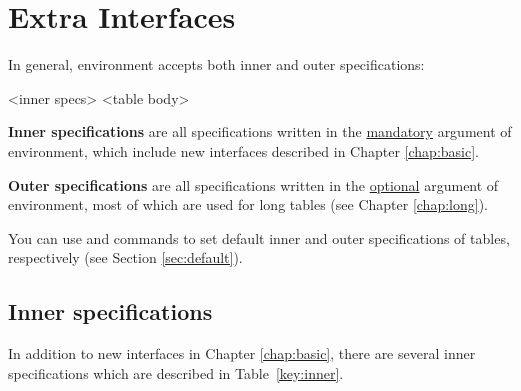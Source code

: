 \documentclass[oneside]{book}
\begin{document}
\chapter{Extra Interfaces}
\label{chap:extra}

In general,  environment accepts both inner and outer specifications:

\begin{codehigh}
\begin{tblr}{<inner specs>}
  <table body>
\end{tblr}
\end{codehigh}

\textbf{Inner specifications} are all specifications written in the \underline{mandatory} argument
of  environment, which include new interfaces described in Chapter \ref{chap:basic}.

\textbf{Outer specifications} are all specifications written in the \underline{optional} argument
of  environment, most of which are used for long tables (see Chapter \ref{chap:long}).

You can use \CC{\SetTblrInner} and \CC{\SetTblrOuter} commands
to set default inner and outer specifications of tables, respectively (see Section \ref{sec:default}).

\section{Inner specifications}

In addition to new interfaces in Chapter \ref{chap:basic},
there are several inner specifications which are described in Table~\ref{key:inner}.
\end{document}
